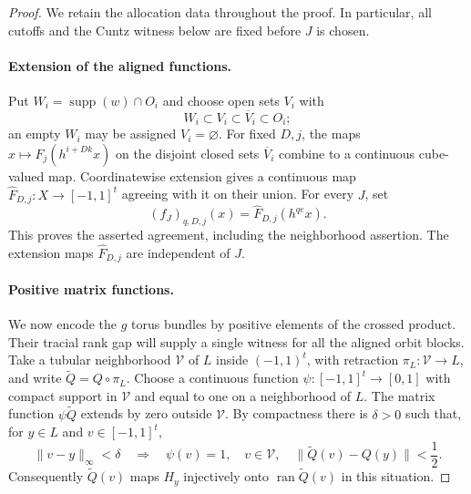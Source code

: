 \begin{proof}
We retain the allocation data throughout the proof.  In particular, all
cutoffs and the Cuntz witness below are fixed before $J$ is chosen.

\paragraph{Extension of the aligned functions.}
Put $W_i=\operatorname{supp}(w)\cap O_i$ and choose open sets $V_i$
with
\[
 W_i\subset V_i\subset\overline V_i\subset O_i;
\]
an empty $W_i$ may be assigned $V_i=\varnothing$.  For fixed $D,j$,
the maps $x\mapsto F_j(h^{i+Dk}x)$ on the disjoint closed sets
$\overline V_i$ combine to a continuous cube-valued map.  Coordinatewise
extension gives a continuous map
$\widehat F_{D,j}:X\to[-1,1]^t$ agreeing with it on their union.
For every $J$, set
\begin{equation}
\label{eq:extended-aligned-functions}
 (f_J)_{q,D,j}(x)=\widehat F_{D,j}(h^{qe}x).
\end{equation}
This proves the asserted agreement, including the neighborhood
assertion.  The extension maps $\widehat F_{D,j}$ are independent of
$J$.

\paragraph{Positive matrix functions.}
We now encode the $g$ torus bundles by positive elements of the crossed
product. Their tracial rank gap will supply a single witness for all the
aligned orbit blocks.
Take a tubular neighborhood $\mathcal V$ of $L$ inside $(-1,1)^t$,
with retraction $\pi_L:\mathcal V\to L$, and write
$\widetilde Q=Q\circ\pi_L$.  Choose a continuous function
$\psi:[-1,1]^t\to[0,1]$ with compact support in $\mathcal V$ and
equal to one on a neighborhood of $L$.  The matrix function
$\psi\widetilde Q$ extends by zero outside $\mathcal V$.
By compactness there is $\delta>0$ such that, for $y\in L$ and
$v\in[-1,1]^t$,
\begin{equation}
\label{eq:nearby-bundle-projections}
 \|v-y\|_\infty<\delta
 \quad\Longrightarrow\quad
 \psi(v)=1,\quad v\in\mathcal V,\quad
 \|\widetilde Q(v)-Q(y)\|<\frac12.
\end{equation}
Consequently $\widetilde Q(v)$ maps $H_y$ injectively onto
$\operatorname{ran}\widetilde Q(v)$ in this situation.


\end{proof}
